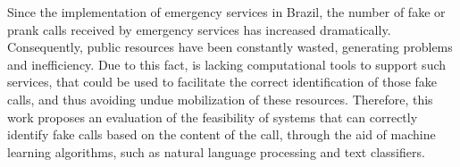 Since the implementation of emergency services in Brazil, the number of fake or prank calls received by emergency services has increased dramatically. Consequently, public resources have been constantly wasted, generating problems and inefficiency. Due to this fact, is lacking computational tools to support such services, that could be used to facilitate the correct identification of those fake calls, and thus avoiding undue mobilization of these resources. Therefore, this work proposes an evaluation of the feasibility of systems that can correctly identify fake calls based on the content of the call, through the aid of machine learning algorithms, such as natural language processing and text classifiers.

